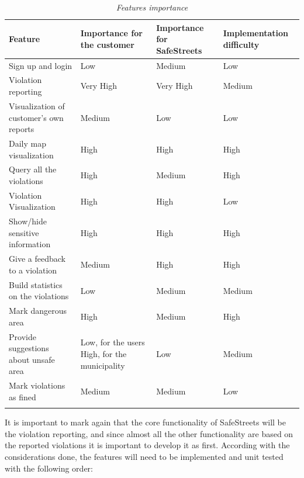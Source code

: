 \documentclass[../RASD.tex]{subfiles}
\begin{document}
    \begin{center}
        \begin{longtable}{| p{.25\linewidth} | p{.25\linewidth} | p{.25\linewidth} | p{.25\linewidth} |}

            \hline
            \textbf{Feature} & \textbf{Importance for the customer} & \textbf{Importance for SafeStreets} & \textbf{Implementation difficulty} \\ \hline
            Sign up and login & Low & Medium & Low\\ \hline
            Violation reporting & Very High & Very High & Medium\\ \hline
            Visualization of customer’s own reports & Medium & Low & Low\\ \hline
            Daily map visualization & High & High & High\\ \hline
            Query all the violations & High & Medium & High\\ \hline
            Violation Visualization & High & High & Low\\ \hline
            Show/hide sensitive information & High & High & High\\ \hline
            Give a feedback to a violation & Medium & High & High\\ \hline
            Build statistics on the violations & Low & Medium & Medium\\ \hline
            Mark dangerous area & High & Medium & High\\ \hline
            Provide suggestions about unsafe area & Low, for the users High, for the municipality & Low & Medium\\ \hline
            Mark violations as fined & Medium & Medium & Low\\ \hline
            \caption[\textit{Features importance}]{\textit{Features importance}}
        \end{longtable}
    \end{center}
    It is important to mark again that the core functionality of SafeStreets will be the violation reporting, and since almost all the other functionality are based on the reported violations it is important to develop it as first.
    According with the considerations done, the features will need to be implemented and unit tested with the following order:
\end{document}
